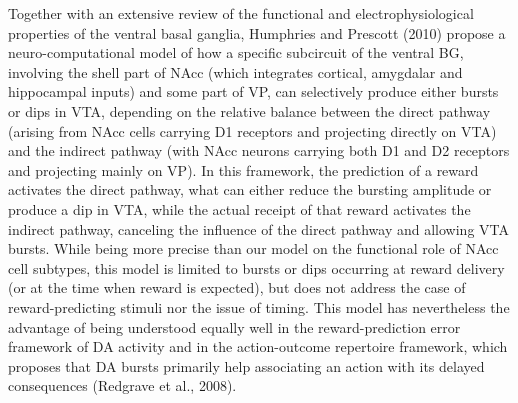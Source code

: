 \documentclass[
  11pt,
  a4paper,
]{scrbook}
\begin{document}
Together with an extensive review of the functional and
electrophysiological properties of the ventral basal ganglia, Humphries
and Prescott (2010) propose a neuro-computational model of how a
specific subcircuit of the ventral BG, involving the shell part of NAcc
(which integrates cortical, amygdalar and hippocampal inputs) and some
part of VP, can selectively produce either bursts or dips in VTA,
depending on the relative balance between the direct pathway (arising
from NAcc cells carrying D1 receptors and projecting directly on VTA)
and the indirect pathway (with NAcc neurons carrying both D1 and D2
receptors and projecting mainly on VP). In this framework, the
prediction of a reward activates the direct pathway, what can either
reduce the bursting amplitude or produce a dip in VTA, while the actual
receipt of that reward activates the indirect pathway, canceling the
influence of the direct pathway and allowing VTA bursts. While being
more precise than our model on the functional role of NAcc cell
subtypes, this model is limited to bursts or dips occurring at reward
delivery (or at the time when reward is expected), but does not address
the case of reward-predicting stimuli nor the issue of timing. This
model has nevertheless the advantage of being understood equally well in
the reward-prediction error framework of DA activity and in the
action-outcome repertoire framework, which proposes that DA bursts
primarily help associating an action with its delayed consequences
(Redgrave et al., 2008).
\end{document}
